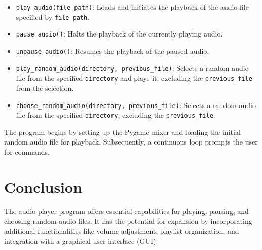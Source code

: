 \documentclass{article}
\begin{document}
\begin{itemize}
  \item \texttt{play\_audio(file\_path)}: Loads and initiates the playback of the audio file specified by \texttt{file\_path}.
  \item \texttt{pause\_audio()}: Halts the playback of the currently playing audio.
  \item \texttt{unpause\_audio()}: Resumes the playback of the paused audio.
  \item \texttt{play\_random\_audio(directory, previous\_file)}: Selects a random audio file from the specified \texttt{directory} and plays it, excluding the \texttt{previous\_file} from the selection.
  \item \texttt{choose\_random\_audio(directory, previous\_file)}: Selects a random audio file from the specified \texttt{directory}, excluding the \texttt{previous\_file}.
\end{itemize}

The program begins by setting up the Pygame mixer and loading the initial random audio file for playback. Subsequently, a continuous loop prompts the user for commands.


\section{Conclusion}
The audio player program offers essential capabilities for playing, pausing, and choosing random audio files. It has the potential for expansion by incorporating additional functionalities like volume adjustment, playlist organization, and integration with a graphical user interface (GUI).
\end{document}
